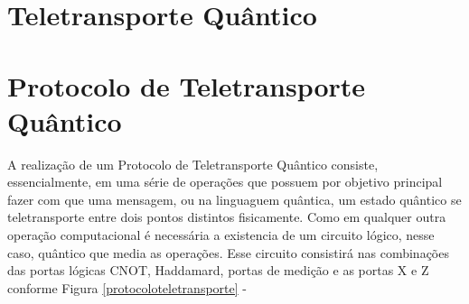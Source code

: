 \section{Teletransporte Quântico}
%
%
%


\section{Protocolo de Teletransporte Quântico}

A realização de um Protocolo de Teletransporte Quântico consiste, essencialmente, em uma série de operações que possuem por objetivo principal fazer com que uma mensagem, ou na linguaguem quântica, um estado quântico se teletransporte entre dois pontos distintos fisicamente.
Como em qualquer outra operação computacional é necessária a existencia de um circuito lógico, nesse caso, quântico que media as operações. Esse circuito consistirá nas combinações das portas lógicas CNOT, Haddamard, portas de medição e as portas X e Z conforme Figura \ref{protocoloteletransporte}
-

